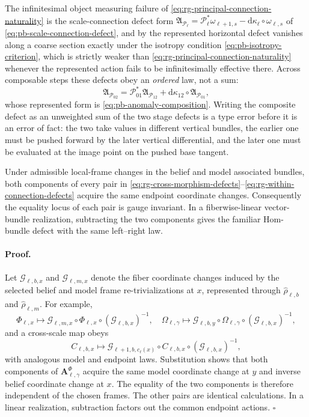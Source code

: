 The infinitesimal object measuring failure of
\eqref{eq:rg-principal-connection-naturality} is the scale-connection defect
form
\(\mathfrak A_{\mathcal P_\ell}
=\mathcal P_\ell^*\omega_{\ell+1,s}-\mathrm d\kappa_\ell\circ\omega_{\ell,s}\)
of \eqref{eq:pb-scale-connection-defect}, and by
 the represented horizontal defect vanishes
along a coarse section exactly under the isotropy condition
\eqref{eq:pb-isotropy-criterion}, which is strictly weaker than
\eqref{eq:rg-principal-connection-naturality} whenever the represented action
fails to be infinitesimally effective there.  Across composable steps these
defects obey an \emph{ordered} law, not a sum:
\begin{equation}
\mathfrak A_{\mathcal P_{02}}
=\mathcal P_{01}^*\mathfrak A_{\mathcal P_{12}}
+\mathrm d\kappa_{12}\circ\mathfrak A_{\mathcal P_{01}},
\label{eq:rg-scale-connection-defect-cocycle}
\end{equation}
whose represented form is \eqref{eq:pb-anomaly-composition}.  Writing the
composite defect as an unweighted sum of the two stage defects is a type error
before it is an error of fact: the two take values in different vertical
bundles, the earlier one must be pushed forward by the later vertical
differential, and the later one must be evaluated at the image point on the
pushed base tangent.  

Under admissible local-frame changes in the belief and model associated
bundles, both components of every pair in
\eqref{eq:rg-cross-morphism-defects}--\eqref{eq:rg-within-connection-defects}
acquire the same endpoint coordinate changes. Consequently the equality
locus of each pair is gauge invariant. In a fiberwise-linear vector-bundle
realization, subtracting the two components gives the familiar Hom-bundle
defect with the same left--right law. 

\paragraph{Proof.}
Let \(\mathscr G_{\ell,b,x}\) and \(\mathscr G_{\ell,m,x}\) denote the fiber
coordinate changes induced by the selected belief and model frame
re-trivializations at \(x\), represented through
\(\widehat\rho_{\ell,b}\) and \(\widehat\rho_{\ell,m}\). For example,
\[
\Phi_{\ell,x}\mapsto
\mathscr G_{\ell,m,x}\circ\Phi_{\ell,x}\circ
(\mathscr G_{\ell,b,x})^{-1},
\quad
\Omega_{\ell,\gamma}\mapsto
\mathscr G_{\ell,b,y}\circ\Omega_{\ell,\gamma}\circ
(\mathscr G_{\ell,b,x})^{-1},
\]
and a cross-scale map obeys
\[
C_{\ell,b,x}\mapsto
\mathscr G_{\ell+1,b,c_\ell(x)}\circ C_{\ell,b,x}\circ
(\mathscr G_{\ell,b,x})^{-1},
\]
with analogous model and endpoint laws. Substitution shows that both
components of \(\mathbf A^\Phi_{\ell,\gamma}\) acquire the same model
coordinate change at \(y\) and inverse belief coordinate change at \(x\).
The equality of the two components is therefore independent of the chosen
frames. The other pairs are identical calculations. In a linear realization,
subtraction factors out the common endpoint actions. \(\square\)

